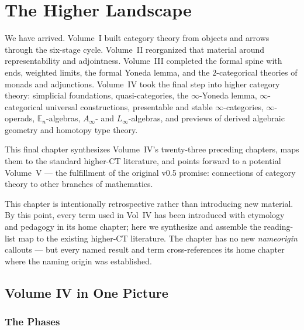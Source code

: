 
\chapter{The Higher Landscape}

\begin{overviewbox}
We have arrived. Volume~I built category theory from objects and arrows
through the six-stage cycle. Volume~II reorganized that material around
representability and adjointness. Volume~III completed the formal spine
with ends, weighted limits, the formal Yoneda lemma, and the
$2$-categorical theories of monads and adjunctions. Volume~IV took the
final step into higher category theory: simplicial foundations,
quasi-categories, the $\infty$-Yoneda lemma, $\infty$-categorical
universal constructions, presentable and stable $\infty$-categories,
$\infty$-operads, $\mathbb{E}_n$-algebras, $A_\infty$- and
$L_\infty$-algebras, and previews of derived algebraic geometry and
homotopy type theory.

This final chapter synthesizes Volume~IV's twenty-three preceding chapters,
maps them to the standard higher-CT literature, and points forward to a
potential Volume~V — the fulfillment of the original v0.5 promise:
connections of category theory to other branches of mathematics.
\end{overviewbox}


\begin{readernote}
This chapter is intentionally retrospective rather than introducing new
material. By this point, every term used in Vol~IV has been introduced
with etymology and pedagogy in its home chapter; here we synthesize
and assemble the reading-list map to the existing higher-CT literature.
The chapter has no new \emph{nameorigin} callouts — but every named
result and term cross-references its home chapter where the naming
origin was established.
\end{readernote}

\section{Volume IV in One Picture}
\label{sec:vol4-picture}

\subsection{The Phases}


